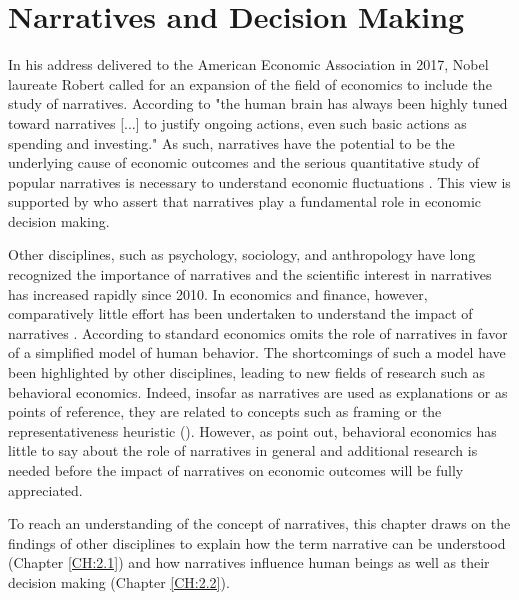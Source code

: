 \documentclass[11pt,a4paper,english,oneside]{book}
\numberwithin{equation}{chapter}
\begin{document}
\chapter{Narratives and Decision Making}\label{NarrativesAndDecisionMaking}

In his address delivered to the American Economic Association in 2017, Nobel laureate Robert \citeauthor{Shiller.2017} called for an expansion of the field of economics to include the study of narratives. According to \citet[p. 967]{Shiller.2017} "the human brain has always been highly tuned
toward narratives [...] to justify ongoing actions, even such basic actions as spending and investing." As such, narratives have the potential to be the underlying cause of economic outcomes and the serious quantitative study of popular narratives is necessary to understand economic fluctuations \cite[p. 967]{Shiller.2017}. This view is supported by \citet{Akerlof.2016} who assert that narratives play a fundamental role in economic decision making.

Other disciplines, such as psychology, sociology, and anthropology have long recognized the importance of narratives and the scientific interest in narratives has increased rapidly since 2010. In economics and finance, however, comparatively little effort has been undertaken to understand the impact of narratives \cite[pp. 970--97]{Shiller.2017}. According to \citet[p. 59]{Akerlof.2016} standard economics omits the role of narratives in favor of a simplified model of human behavior. The shortcomings of such a model have been highlighted by other disciplines, leading to new fields of research such as behavioral economics. Indeed, insofar as narratives are used as explanations or as points of reference, they are related to concepts such as framing or the representativeness heuristic (\citealp{Kahnemann.1974,Kahneman.2002,Thaler.2016}). However, as \citet[p. 59]{Akerlof.2016} point out, behavioral economics has little to say about the role of narratives in general and additional research is needed before the impact of narratives on economic outcomes will be fully appreciated. 

To reach an understanding of the concept of narratives, this chapter draws on the findings of other disciplines to explain how the term narrative can be understood (Chapter \ref{CH:2.1}) and how narratives influence human beings as well as their decision making (Chapter \ref{CH:2.2}). 


\end{document}
